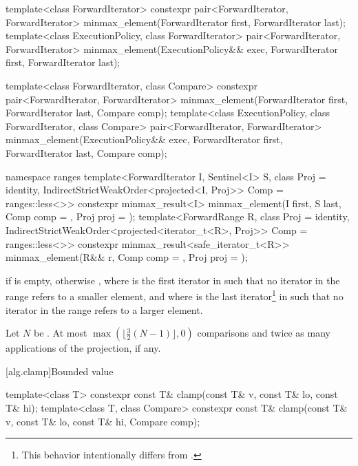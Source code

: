 %
\begin{itemdecl}
template<class ForwardIterator>
  constexpr pair<ForwardIterator, ForwardIterator>
    minmax_element(ForwardIterator first, ForwardIterator last);
template<class ExecutionPolicy, class ForwardIterator>
  pair<ForwardIterator, ForwardIterator>
    minmax_element(ExecutionPolicy&& exec,
                   ForwardIterator first, ForwardIterator last);

template<class ForwardIterator, class Compare>
  constexpr pair<ForwardIterator, ForwardIterator>
    minmax_element(ForwardIterator first, ForwardIterator last, Compare comp);
template<class ExecutionPolicy, class ForwardIterator, class Compare>
  pair<ForwardIterator, ForwardIterator>
    minmax_element(ExecutionPolicy&& exec,
                   ForwardIterator first, ForwardIterator last, Compare comp);

namespace ranges {
  template<ForwardIterator I, Sentinel<I> S, class Proj = identity,
           IndirectStrictWeakOrder<projected<I, Proj>> Comp = ranges::less<>>
    constexpr minmax_result<I>
      minmax_element(I first, S last, Comp comp = {}, Proj proj = {});
  template<ForwardRange R, class Proj = identity,
           IndirectStrictWeakOrder<projected<iterator_t<R>, Proj>> Comp = ranges::less<>>
    constexpr minmax_result<safe_iterator_t<R>>
      minmax_element(R&& r, Comp comp = {}, Proj proj = {});
}
\end{itemdecl}


\begin{itemdescr}
\pnum
\returns
{} if  is empty, otherwise
, where  is
the first iterator in  such that no iterator in the range refers
to a smaller element, and where  is the last iterator\footnote{This behavior
intentionally differs from .}
in  such that no iterator in the range refers to a larger element.

\pnum
\complexity
Let $N$ be .
At most $\max(\bigl\lfloor{\frac{3}{2}} (N-1)\bigr\rfloor, 0)$ comparisons and
twice as many applications of the projection, if any.
\end{itemdescr}

[alg.clamp]{Bounded value}

%
\begin{itemdecl}
template<class T>
  constexpr const T& clamp(const T& v, const T& lo, const T& hi);
template<class T, class Compare>
  constexpr const T& clamp(const T& v, const T& lo, const T& hi, Compare comp);
\end{itemdecl}

